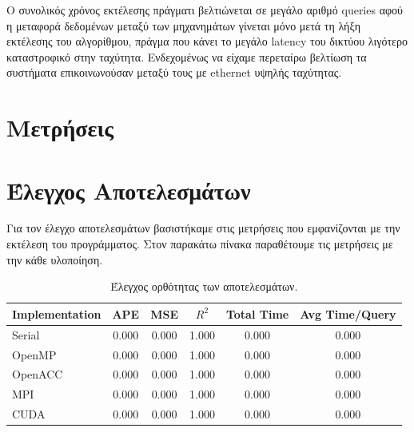 \documentclass[11pt]{scrartcl} %
\begin{document}
Ο συνολικός χρόνος εκτέλεσης πράγματι βελτιώνεται σε μεγάλο αριθμό queries αφού η μεταφορά δεδομένων μεταξύ των μηχανημάτων γίνεται μόνο
μετά τη λήξη εκτέλεσης του αλγορίθμου, πράγμα που κάνει το μεγάλο latency του δικτύου λιγότερο καταστροφικό στην ταχύτητα.
Ενδεχομένως να είχαμε περεταίρω βελτίωση τα συστήματα επικοινωνούσαν μεταξύ τους με ethernet υψηλής ταχύτητας. \cite{mpi-ethernet}

\section{Μετρήσεις}

\section{Έλεγχος Αποτελεσμάτων}

Για τον έλεγχο αποτελεσμάτων βασιστήκαμε στις μετρήσεις που εμφανίζονται με την εκτέλεση του προγράμματος.
Στον παρακάτω πίνακα παραθέτουμε τις μετρήσεις με την κάθε υλοποίηση.

\begin{table}[H]
    \centering
    \begin{tabular}{|l|c|c|c|c|c|}
    \hline
        Implementation & APE   & MSE   & $R^2$ & Total Time & Avg Time/Query \\ \hline
        Serial         & 0.000 & 0.000 & 1.000 & 0.000      & 0.000          \\
        OpenMP         & 0.000 & 0.000 & 1.000 & 0.000      & 0.000          \\
        OpenACC        & 0.000 & 0.000 & 1.000 & 0.000      & 0.000          \\
        MPI            & 0.000 & 0.000 & 1.000 & 0.000      & 0.000          \\
        CUDA           & 0.000 & 0.000 & 1.000 & 0.000      & 0.000          \\
    \hline
    \end{tabular}

    \caption{Έλεγχος ορθότητας των αποτελεσμάτων.}
\end{table}




\end{document}
